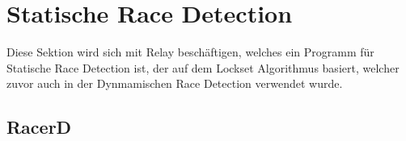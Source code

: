 \section{Statische Race Detection}

Diese Sektion wird sich mit Relay beschäftigen, welches ein Programm für Statische Race Detection ist, der auf dem Lockset Algorithmus basiert, welcher zuvor auch in der Dynmamischen Race Detection verwendet wurde.


%
%
%
%
%
%
%
%
%
\subsection{RacerD}